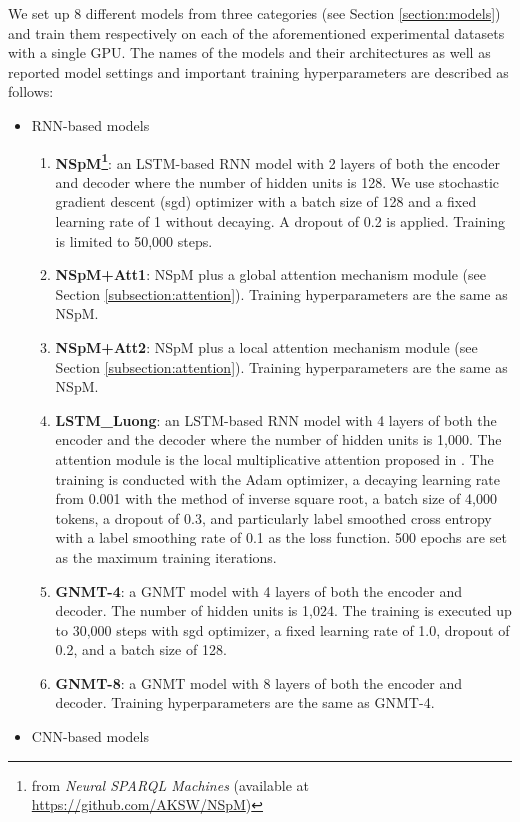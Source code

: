 We set up 8 different models from three categories (see Section \ref{section:models}) and train them respectively on each of the aforementioned experimental datasets with a single GPU. The names of the models and their architectures as well as reported model settings and important training hyperparameters are described as follows:
\begin{itemize}
\item RNN-based models
\begin{enumerate}
\item \textbf{NSpM\footnote{from \textit{Neural SPARQL Machines} (available at \url{https://github.com/AKSW/NSpM})}}: an LSTM-based RNN model with 2 layers of both the encoder and decoder where the number of hidden units is 128. We use stochastic gradient descent (sgd) optimizer with a batch size of 128 and a fixed learning rate of 1 without decaying. A dropout of 0.2 is applied. Training is limited to 50,000 steps.
\item \textbf{NSpM+Att1}: NSpM plus a global attention mechanism module (see Section \ref{subsection:attention}). Training hyperparameters are the same as NSpM.
\item \textbf{NSpM+Att2}: NSpM plus a local attention mechanism module (see Section \ref{subsection:attention}). Training hyperparameters are the same as NSpM.
\item \textbf{LSTM\_Luong}: an LSTM-based RNN model with 4 layers of both the encoder and the decoder where the number of hidden units is 1,000. The attention module is the local multiplicative attention proposed in \cite{Luong2015}. The training is conducted with the Adam optimizer, a decaying learning rate from 0.001 with the method of inverse square root, a batch size of 4,000 tokens, a dropout of 0.3, and particularly label smoothed cross entropy with a label smoothing rate of 0.1 as the loss function. 500 epochs are set as the maximum training iterations. 
\item \textbf{GNMT-4}: a GNMT model with 4 layers of both the encoder and decoder. The number of hidden units is 1,024. The training is executed up to 30,000 steps with sgd optimizer, a fixed learning rate of 1.0, dropout of 0.2, and a batch size of 128.
\item \textbf{GNMT-8}: a GNMT model with 8 layers of both the encoder and decoder. Training hyperparameters are the same as GNMT-4.
\end{enumerate}
\item CNN-based models
\begin{enumerate}

\end{enumerate}
\end{itemize}

